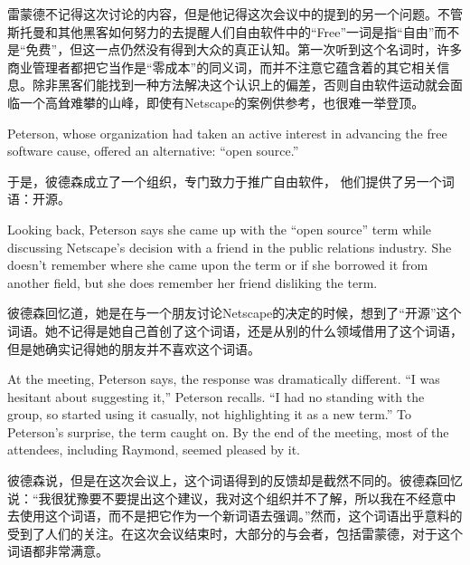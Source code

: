 \ifdefined\chs
雷蒙德不记得这次讨论的内容，但是他记得这次会议中的提到的另一个问题。不管斯托曼和其他黑客如何努力的去提醒人们自由软件中的“Free”一词是指“自由”而不是“免费”，但这一点仍然没有得到大众的真正认知。第一次听到这个名词时，许多商业管理者都把它当作是“零成本”的同义词，而并不注意它蕴含着的其它相关信息。除非黑客们能找到一种方法解决这个认识上的偏差，否则自由软件运动就会面临一个高耸难攀的山峰，即使有Netscape的案例供参考，也很难一举登顶。
\fi

\ifdefined\eng
Peterson, whose organization had taken an active interest in advancing the free software cause, offered an alternative: ``open source.''
\fi

\ifdefined\chs
于是，彼德森成立了一个组织，专门致力于推广自由软件， 他们提供了另一个词语：开源。
\fi

\ifdefined\eng
Looking back, Peterson says she came up with the ``open source'' term while discussing Netscape's decision with a friend in the public relations industry. She doesn't remember where she came upon the term or if she borrowed it from another field, but she does remember her friend disliking the term.
\fi

\ifdefined\chs
彼德森回忆道，她是在与一个朋友讨论Netscape的决定的时候，想到了“开源”这个词语。她不记得是她自己首创了这个词语，还是从别的什么领域借用了这个词语，但是她确实记得她的朋友并不喜欢这个词语。
\fi

\ifdefined\eng
At the meeting, Peterson says, the response was dramatically different. ``I was hesitant about suggesting it,'' Peterson recalls. ``I had no standing with the group, so started using it casually, not highlighting it as a new term.'' To Peterson's surprise, the term caught on. By the end of the meeting, most of the attendees, including Raymond, seemed pleased by it.
\fi

\ifdefined\chs
彼德森说，但是在这次会议上，这个词语得到的反馈却是截然不同的。彼德森回忆说：“我很犹豫要不要提出这个建议，我对这个组织并不了解，所以我在不经意中去使用这个词语，而不是把它作为一个新词语去强调。”然而，这个词语出乎意料的受到了人们的关注。在这次会议结束时，大部分的与会者，包括雷蒙德，对于这个词语都非常满意。
\fi

